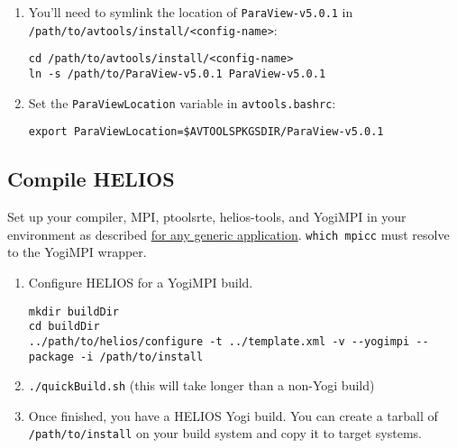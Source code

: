 \documentclass{article}
\begin{document}
\begin{enumerate}
\begin{enumerate}
\item You'll need to symlink the location of \texttt{ParaView-v5.0.1} in \texttt{/path/to/avtools/install/<config-name>}:
\begin{verbatim}
cd /path/to/avtools/install/<config-name>
ln -s /path/to/ParaView-v5.0.1 ParaView-v5.0.1
\end{verbatim}
\item Set the \texttt{ParaViewLocation} variable in \texttt{avtools.bashrc}:
\begin{verbatim}
export ParaViewLocation=$AVTOOLSPKGSDIR/ParaView-v5.0.1
\end{verbatim}
\end{enumerate}
\end{enumerate}

\subsection{Compile HELIOS}

Set up your compiler, MPI, ptoolsrte, helios-tools, and YogiMPI in your environment as described \hyperref[generic:compile]{for any generic application}. \texttt{which mpicc} must resolve to the YogiMPI wrapper.
\begin{enumerate}
\item Configure HELIOS for a YogiMPI build.
\begin{verbatim}
mkdir buildDir
cd buildDir
../path/to/helios/configure -t ../template.xml -v --yogimpi --package -i /path/to/install
\end{verbatim}

\item \texttt{./quickBuild.sh} (this will take longer than a non-Yogi build)

\item Once finished, you have a HELIOS Yogi build. You can create a tarball of \texttt{/path/to/install} on your build system and copy it to target systems. 
\end{enumerate}
\end{document}
